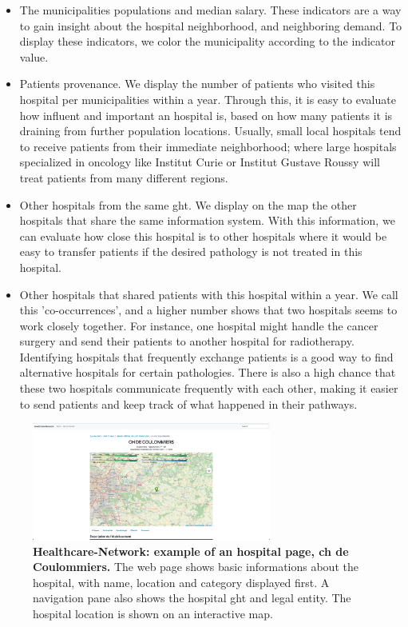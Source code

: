 \begin{itemize}
    \item The municipalities populations and median salary. These indicators are
          a way to gain insight about the hospital neighborhood, and neighboring
          demand. To display these indicators, we color the municipality according
          to the indicator value.
    \item Patients provenance. We display the number of patients who visited
          this hospital per municipalities within a year. Through this, it is
          easy to evaluate how influent and important an hospital is, based on
          how many patients it is draining from further population locations.
          Usually, small local hospitals tend to receive patients from their
          immediate neighborhood; where large hospitals specialized in oncology
          like Institut Curie or Institut Gustave Roussy will treat patients
          from many different regions.
    \item Other hospitals from the same \ac{ght}. We display on the map the other
          hospitals that share the same information system. With this information,
          we can evaluate how close this hospital is to other hospitals where it
          would be easy to transfer patients if the desired pathology is not treated
          in this hospital.
    \item Other hospitals that shared patients with this hospital within a year.
          We call this 'co-occurrences', and a higher number shows that two
          hospitals seems to work closely together. For instance, one hospital
          might handle the cancer surgery and send their patients to another
          hospital for radiotherapy. Identifying hospitals that frequently
          exchange patients is a good way to find alternative hospitals for
          certain pathologies. There is also a high chance that these two
          hospitals communicate frequently with each other, making it easier
          to send patients and keep track of what happened in their pathways.
\end{itemize}

\begin{figure}[H]
    \includegraphics[width=0.7\textwidth]{images/healthcare-network/hospital-page.png}
    \centering
    \caption{ \textbf{Healthcare-Network: example of an hospital page, \acf{ch}
            de Coulommiers.} The web page shows basic informations about the
        hospital, with name, location and category displayed first. A navigation
        pane also shows the hospital \ac{ght} and legal entity. The hospital
        location is shown on an interactive map. }
    \label{fig:hn-coulommiers-page}
\end{figure}

